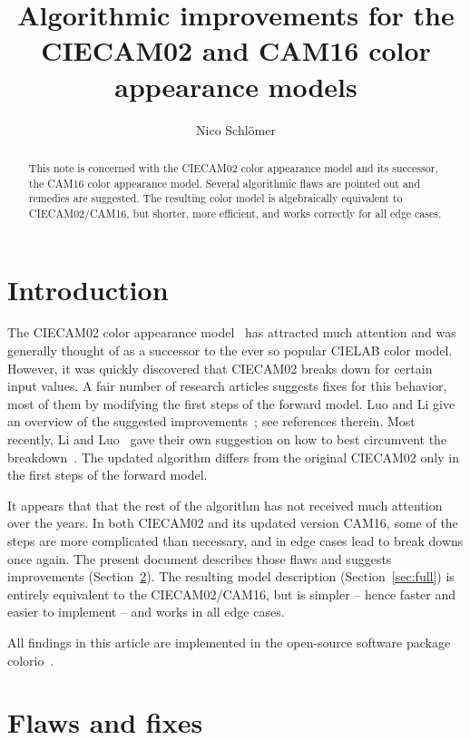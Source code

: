 \documentclass[twocolumn]{scrartcl}
\title{Algorithmic improvements for the CIECAM02 and CAM16 color appearance models}
\author{Nico Schlömer}
\theoremstyle{named}
\begin{document}
\maketitle
\begin{abstract}
  This note is concerned with the CIECAM02 color appearance model and its
  successor, the CAM16 color appearance model. Several algorithmic flaws are
  pointed out and remedies are suggested. The resulting color model is
  algebraically equivalent to CIECAM02/CAM16, but shorter, more efficient, and
  works correctly for all edge cases.
\end{abstract}

\section{Introduction}

The CIECAM02 color appearance model~\cite{ciecam02} has attracted much
attention and was generally thought of as a successor to the ever so popular
CIELAB color model. However, it was quickly discovered that CIECAM02 breaks
down for certain input values. A fair number of research articles suggests
fixes for this behavior, most of them by modifying the first steps of the
forward model. Luo and Li give an overview of the suggested
improvements~\cite{ciecam02-recent}; see references therein.  Most recently,
Li and Luo~\cite{cam16} gave their own suggestion on how to best
circumvent the breakdown~\cite{cam16}. The updated algorithm differs from the
original CIECAM02 only in the first steps of the forward model.

It appears that that the rest of the algorithm has not received much attention
over the years. In both CIECAM02 and its updated version CAM16, some of the
steps are more complicated than necessary, and in edge cases lead to break
downs once again. The present document describes those flaws and suggests
improvements (Section~\ref{sec:ff}). The resulting model description
(Section~\ref{sec:full}) is entirely equivalent to the CIECAM02/CAM16, but is
simpler -- hence faster and easier to implement -- and works in all edge
cases.

All findings in this article are implemented in the open-source software package
colorio~\cite{colorio}.


\section{Flaws and fixes}\label{sec:ff}
\end{document}
